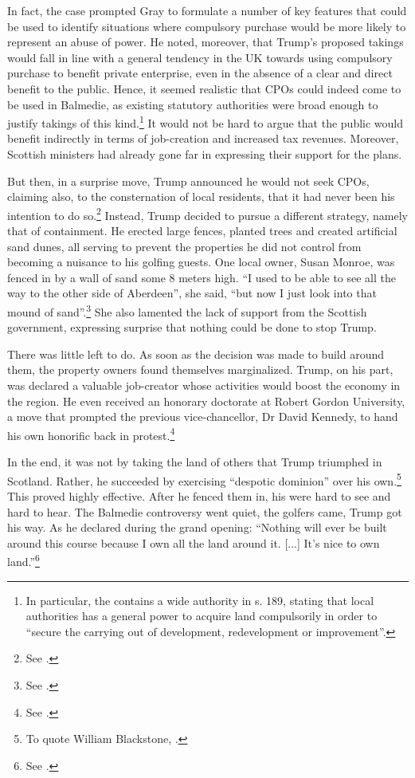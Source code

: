 In fact, the case prompted Gray to formulate a number of key features that could be used to identify situations where compulsory purchase would be more likely to represent an abuse of power. He noted, moreover, that Trump's proposed takings would fall in line with a general tendency in the UK towards using compulsory purchase to benefit private enterprise, even in the absence of a clear and direct benefit to the public. Hence, it seemed realistic that CPOs could indeed come to be used in Balmedie, as existing statutory authorities were broad enough to justify takings of this kind.\footnote{In particular, the \cite{tcpsa97} contains a wide authority in s. 189, stating that local authorities has a general power to acquire land compulsorily in order to ``secure the carrying out of development, redevelopment or improvement''.} It would not be hard to argue that the public would benefit indirectly in terms of job-creation and increased tax revenues. Moreover, Scottish ministers had already gone far in expressing their support for the plans.

But then, in a surprise move, Trump announced he would not seek CPOs, claiming also, to the consternation of local residents, that it had never been his intention to do so.\footnote{See \cite{scotsman11}.} Instead, Trump decided to pursue a different strategy, namely that of containment. He erected large fences, planted trees and created artificial sand dunes, all serving to prevent the properties he did not control from becoming a nuisance to his golfing guests. One local owner, Susan Monroe, was fenced in by a wall of sand some 8 meters high. ``I used to be able to see all the way to the other side of Aberdeen'', she said, ``but now I just look into that mound of sand''.\footnote{See \cite{booth12}.} She also lamented the lack of support from the Scottish government, expressing surprise that nothing could be done to stop Trump.

There was little left to do. As soon as the decision was made to build around them, the  property owners found themselves marginalized. Trump, on his part, was declared a valuable job-creator whose activities would boost the economy in the region. He even received an honorary doctorate at Robert Gordon University, a move that prompted the previous vice-chancellor, Dr David Kennedy, to hand his own honorific back in protest.\footnote{See \cite{bbc10b}.}

In the end, it was not by taking the land of others that Trump triumphed in Scotland. Rather, he succeeded by exercising ``despotic dominion'' over his own.\footnote{To quote William Blackstone, \cite[2]{blackstone79b}.} This proved highly effective. After he fenced them in, his  were hard to see and hard to hear. The Balmedie controversy went quiet, the golfers came, Trump got his way. As he declared during the grand opening: ``Nothing will ever be built around this course because I own all the land around it. [...] It's nice to own land.''\footnote{See \cite{booth12}.}

